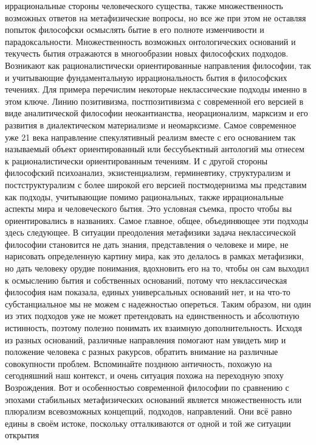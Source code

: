 иррациональные стороны человеческого существа, также множественность возможных
ответов на метафизические вопросы, но все же при этом не оставляя попыток
философски осмыслять бытие в его полноте изменчивости и парадоксальности.
Множественность возможных онтологических оснований и текучесть бытия отражаются
в многообразии новых философских подходов. Возникают как рационалистически
ориентированные направления философии, так и учитывающие фундаментальную
иррациональность бытия в философских течениях. Для примера перечислим некоторые
неклассические подходы именно в этом ключе. Линию позитивизма, постпозитивизма с
современной его версией в виде аналитической философии неокантианства,
неорационализм, марксизм и его развития в диалектическом материализме и
неомарксизме. Самое современное уже 21 века направление спекулятивный реализм
вместе с его основанием так называемый объект ориентированный или бессубъектный
антологий мы отнесем к рационалистически ориентированным течениям. И с другой
стороны философский психоанализ, экзистенциализм, герминевтику, структурализм и
постструктурализм с более широкой его версией постмодернизма мы представим как
подходы, учитывающие помимо рациональных, также иррациональные аспекты мира и
человеческого бытия. Это условная съемка, просто чтобы вы ориентировались в
названиях. Самое главное, общее, объединяющее эти подходы здесь следующее. В
ситуации преодоления метафизики задача неклассической философии становится не
дать знания, представления о человеке и мире, не нарисовать определенную картину
мира, как это делалось в рамках метафизики, но дать человеку орудие понимания,
вдохновить его на то, чтобы он сам выходил к осмыслению бытия и собственных
оснований, потому что неклассическая философия нам показала, единых
универсальных оснований нет, и на что-то субстанциальное мы не можем с
надежностью опереться. Таким образом, ни один из этих подходов уже не может
претендовать на единственность и абсолютную истинность, поэтому полезно понимать
их взаимную дополнительность. Исходя из разных оснований, различные направления
помогают нам увидеть мир и положение человека с разных ракурсов, обратить
внимание на различные совокупности проблем. Вспоминайте позднюю античность,
похожую на сегодняшний наш контекст, и очень ситуация похожа на переходную эпоху
Возрождения. Вот и особенностью современной философии по сравнению с эпохами
стабильных метафизических оснований является множественность или плюрализм
всевозможных концепций, подходов, направлений. Они всё равно едины в своём
истоке, поскольку отталкиваются от одной и той же ситуации открытия
